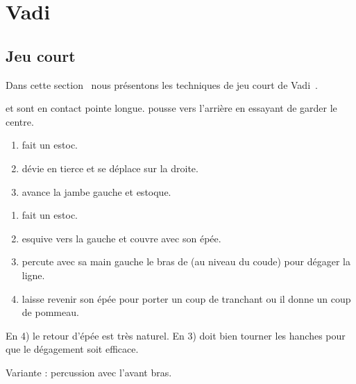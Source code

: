 \section{Vadi}


\subsection{Jeu court}


Dans cette section~\footnotemark{} nous présentons les techniques de jeu court de Vadi~\cite{Vadi:Petit:2013:EpeeLongue}.


\begin{exercice}
\A et \D sont en contact pointe longue.
\A pousse \D vers l'arrière en essayant de garder le centre.

\end{exercice}


\begin{technique}

\begin{enumerate}
	\item \A fait un estoc.
	\item \D dévie en tierce et se déplace sur la droite.
	\item \D avance la jambe gauche et estoque.
\end{enumerate}
\end{technique}


\begin{technique}

\begin{enumerate}
	\item \A fait un estoc.
	\item \D esquive vers la gauche et couvre avec son épée.
	\item \D percute avec sa main gauche le bras de \A (au niveau du coude) pour dégager la ligne.
	\item \D laisse revenir son épée pour porter un coup de tranchant ou il donne un coup de pommeau.
\end{enumerate}

En 4) le retour d'épée est très naturel.
En 3) \A doit bien tourner les hanches pour que le dégagement soit efficace.

Variante : percussion avec l'avant bras.
\end{technique}


